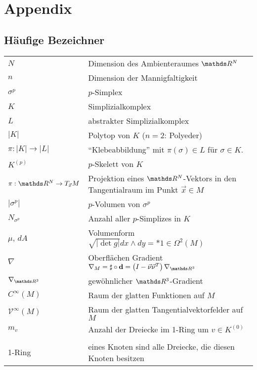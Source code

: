 \newcommand{\trace}{\text{Trace}}

\setcounter{page}{1}

\chapter{Appendix}

\section{Häufige Bezeichner}

\begin{tabular}{p{}p{}}
  \( N \) & Dimension des Ambienteraumes \( \R^{N} \) \\
  \( n \) & Dimension der Mannigfaltigkeit \\
  \( \sigma^{p} \) & \( p \)-Simplex \\
  \( K \) & Simplizialkomplex \\
  \( L \) & abstrakter Simplizialkomplex\\
  \( |K| \) & Polytop von \( K \) (\( n=2 \): Polyeder)\\
  \( \pi: |K| \rightarrow |L| \) & "`Klebeabbildung"'  mit \( \pi(\sigma)\in L \) für \( \sigma\in K \). \\
  \( K^{(p)} \) & \( p \)-Skelett von \( K \)\\
  \( \pi: \R^{N}\rightarrow T_{\vec{x}}M \) & Projektion eines \( \R^{N} \)-Vektors in den Tangentialraum im Punkt \( \vec{x}\in M \) \\
  \( \left| \sigma^{p} \right| \) & \( p \)-Volumen von \( \sigma^{p} \)\\
  \( N_{\sigma^{p}} \) & Anzahl aller \( p \)-Simplizes in \( K \)\\
  \( \mu \), \( dA \) & Volumenform \( \sqrt{|\det g|} dx\wedge dy = *1 \in \Omega^{2}(M) \) \\
  \( \nabla \) & Oberflächen Gradient \( \nabla_{M} = \sharp\circ\exd 
                                                    = \left( I - \vec{\nu}\vec{\nu}^{T}
                                                    \right)\nabla_{\R^{3}} \) \\
  \( \nabla_{\R^{3}} \) & gewöhnlicher \( \R^{3} \)-Gradient \\
  \( C^{\infty}(M) \) & Raum der glatten Funktionen auf \( M \) \\
  \( \mathcal{V}^{\infty}(M) \) & Raum der glatten Tangentialvektorfelder auf \( M \) \\
  \( m_{v} \) & Anzahl der Dreiecke im 1-Ring um \( v\in K^{(0)}\)\\
  &\\
  1-Ring & eines Knoten sind alle Dreiecke, die diesen Knoten besitzen \\
\end{tabular}


